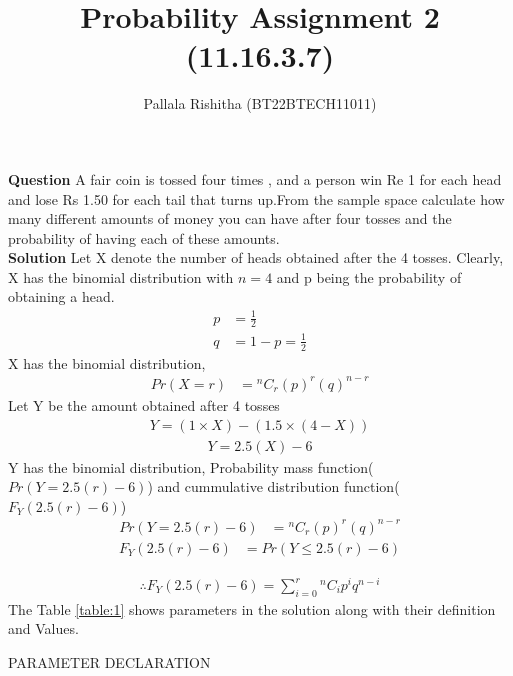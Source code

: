 \documentclass[12pt,onecolumn,notitlepage]{article}
\title{Probability Assignment 2 (11.16.3.7)}
\author{Pallala Rishitha (BT22BTECH11011)}
\date{}
\providecommand{\brak}[1]{\ensuremath{\left(#1\right)}}
\newcommand*{\comb}[2]{{}^{#1}C_{#2}}
\begin{document}
\maketitle
\textbf{Question}
A fair coin is tossed four times , and a person win Re 1 for each head and lose Rs 1.50 for each tail that turns up.From the sample space calculate how many different amounts of money you can have after four tosses and the
probability of having each of these amounts. \\
\textbf{Solution}
Let X denote the number of heads obtained after the 4 tosses. Clearly, X has the binomial distribution with $n=4$ and p being the probability of obtaining a head.
\begin{align}
    p &= \frac{1}{2} \\ 
    q &=1-p = \frac{1}{2}     
\end{align}
 X has the binomial distribution,
\begin{align}
 Pr\brak{X=r} &= \comb{n}{r}\brak{p}^{r}\brak{q}^{n-r} 
\end{align}
Let Y be the amount obtained after 4 tosses
\begin{align}
    Y= (1\times X) - (1.5\times(4-X))
\end{align}
\begin{align}
    Y= 2.5(X) - 6
\end{align}
Y has the binomial distribution, Probability mass function($Pr\brak{Y= 2.5(r) - 6}$) and  cummulative distribution function($F_Y\brak{2.5(r) - 6}$)
\begin{align}
 Pr\brak{Y= 2.5(r) - 6} &= \comb{n}{r}\brak{p}^{r}\brak{q}^{n-r} 
\end{align}
\begin{align}
    F_Y\brak{2.5(r) - 6} &= Pr\brak{Y \le  2.5(r) - 6}
\end{align}

\begin{align}
    \therefore   F_Y(2.5(r) - 6)=\sum_{i=0}^r\comb{n}{i}p^iq^{n-i}
\end{align}
 The Table \ref{table:1} shows parameters in the solution along with their definition and Values.\\
 \setlength{\tabcolsep}{16pt}
 \renewcommand{\arraystretch}{1.5}
 \clearpage
 \begin{table}[h!]
\centering

\caption{PARAMETER DECLARATION}
\label{table:1}
\end{table}
\end{document}
